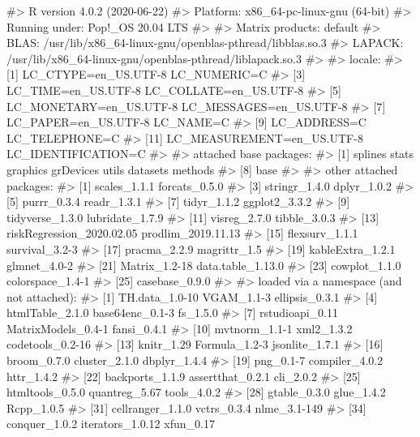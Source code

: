 \documentclass[
]{jss}
\begin{document}
\begin{CodeChunk}

\begin{CodeOutput}
#> R version 4.0.2 (2020-06-22)
#> Platform: x86_64-pc-linux-gnu (64-bit)
#> Running under: Pop!_OS 20.04 LTS
#> 
#> Matrix products: default
#> BLAS:   /usr/lib/x86_64-linux-gnu/openblas-pthread/libblas.so.3
#> LAPACK: /usr/lib/x86_64-linux-gnu/openblas-pthread/liblapack.so.3
#> 
#> locale:
#>  [1] LC_CTYPE=en_US.UTF-8       LC_NUMERIC=C              
#>  [3] LC_TIME=en_US.UTF-8        LC_COLLATE=en_US.UTF-8    
#>  [5] LC_MONETARY=en_US.UTF-8    LC_MESSAGES=en_US.UTF-8   
#>  [7] LC_PAPER=en_US.UTF-8       LC_NAME=C                 
#>  [9] LC_ADDRESS=C               LC_TELEPHONE=C            
#> [11] LC_MEASUREMENT=en_US.UTF-8 LC_IDENTIFICATION=C       
#> 
#> attached base packages:
#> [1] splines   stats     graphics  grDevices utils     datasets  methods  
#> [8] base     
#> 
#> other attached packages:
#>  [1] scales_1.1.1              forcats_0.5.0            
#>  [3] stringr_1.4.0             dplyr_1.0.2              
#>  [5] purrr_0.3.4               readr_1.3.1              
#>  [7] tidyr_1.1.2               ggplot2_3.3.2            
#>  [9] tidyverse_1.3.0           lubridate_1.7.9          
#> [11] visreg_2.7.0              tibble_3.0.3             
#> [13] riskRegression_2020.02.05 prodlim_2019.11.13       
#> [15] flexsurv_1.1.1            survival_3.2-3           
#> [17] pracma_2.2.9              magrittr_1.5             
#> [19] kableExtra_1.2.1          glmnet_4.0-2             
#> [21] Matrix_1.2-18             data.table_1.13.0        
#> [23] cowplot_1.1.0             colorspace_1.4-1         
#> [25] casebase_0.9.0           
#> 
#> loaded via a namespace (and not attached):
#>  [1] TH.data_1.0-10      VGAM_1.1-3          ellipsis_0.3.1     
#>  [4] htmlTable_2.1.0     base64enc_0.1-3     fs_1.5.0           
#>  [7] rstudioapi_0.11     MatrixModels_0.4-1  fansi_0.4.1        
#> [10] mvtnorm_1.1-1       xml2_1.3.2          codetools_0.2-16   
#> [13] knitr_1.29          Formula_1.2-3       jsonlite_1.7.1     
#> [16] broom_0.7.0         cluster_2.1.0       dbplyr_1.4.4       
#> [19] png_0.1-7           compiler_4.0.2      httr_1.4.2         
#> [22] backports_1.1.9     assertthat_0.2.1    cli_2.0.2          
#> [25] htmltools_0.5.0     quantreg_5.67       tools_4.0.2        
#> [28] gtable_0.3.0        glue_1.4.2          Rcpp_1.0.5         
#> [31] cellranger_1.1.0    vctrs_0.3.4         nlme_3.1-149       
#> [34] conquer_1.0.2       iterators_1.0.12    xfun_0.17          

\end{CodeOutput}
\end{CodeChunk}
\end{document}
